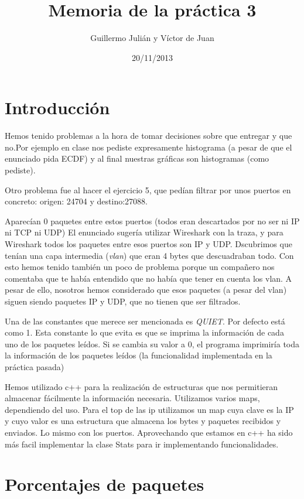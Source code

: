 \documentclass[nochap]{apuntes}
\title{Memoria de la práctica 3}
\author{Guillermo Julián y Víctor de Juan}
\date{20/11/2013}
\begin{document}
\pagestyle{plain}
\maketitle

\section{Introducción}

Hemos tenido problemas a la hora de tomar decisiones sobre que entregar y que no.Por ejemplo en clase nos pediste expresamente histograma (a pesar de que el enunciado pida ECDF) y al final nuestras gráficas son histogramas (como pediste).

Otro problema fue al hacer el ejercicio 5, que pedían filtrar por unos puertos en concreto: origen: 24704 y destino:27088.

Aparecían 0 paquetes entre estos puertos (todos eran descartados por no ser ni IP ni TCP ni UDP) El enunciado sugería utilizar Wireshark con la traza, y para Wireshark todos los paquetes entre esos puertos son IP y UDP. Dscubrimos que tenían una capa intermedia (\emph{vlan}) que eran 4 bytes que descuadraban todo. Con esto hemos tenido también un poco de problema porque un compañero nos comentaba que te había entendido que no había que tener en cuenta los vlan. A pesar de ello, nosotros hemos considerado que esos paquetes (a pesar del vlan) siguen siendo paquetes IP y UDP, que no tienen que ser filtrados.

Una de las constantes que merece ser mencionada es \emph{QUIET}. Por defecto está como 1. Esta constante lo que evita es que se imprima la información de cada uno de los paquetes leídos. Si se cambia su valor a 0, el programa imprimiría toda la información de los paquetes leídos (la funcionalidad implementada en la práctica pasada)

Hemos utilizado c++ para la realización de estructuras que nos permitieran almacenar fácilmente la información necesaria. Utilizamos varios maps, dependiendo del uso. Para el top de las ip utilizamos un map cuya clave es la IP y cuyo valor es una estructura que almacena los bytes y paquetes recibidos y enviados. Lo mismo con los puertos. Aprovechando que estamos en c++ ha sido más facil implementar la clase Stats para ir implementando funcionalidades.

\section{Porcentajes de paquetes}
\end{document}

